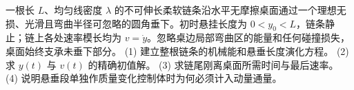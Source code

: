 一根长 \(L\)、均匀线密度 \(\lambda\) 的不可伸长柔软链条沿水平无摩擦桌面通过一个理想无损、光滑且弯曲半径可忽略的圆角垂下。初时悬挂长度为 \(0<y_0<L\)，链条静止；链上各处速率模长均为 \(v=\dot y\)。忽略桌边局部弯曲区的能量和任何碰撞损失，桌面始终支承未垂下部分。
(1) 建立整根链条的机械能和悬垂长度演化方程。
(2) 求 \(y(t)\) 与 \(v(t)\) 的精确初值解。
(3) 求链尾刚离桌面所需时间与最后速率。
(4) 说明悬垂段单独作质量变化控制体时为何必须计入动量通量。
